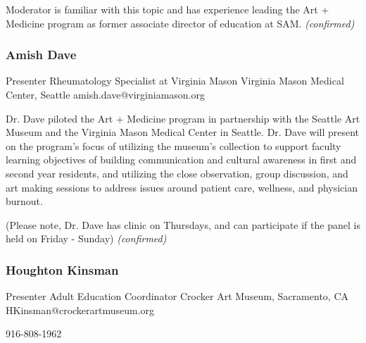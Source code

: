 \documentclass{report}
\begin{document}
                Moderator is familiar with this topic and has experience leading the Art + Medicine program as former associate director of education at SAM.\newline
                \emph{ (confirmed) }
              

              
                \subsubsection*{ Amish Dave }
                Presenter\newline
                Rheumatology Specialist at Virginia Mason\newline
                Virginia Mason Medical Center, Seattle
                \newline
                amish.dave@virginiamason.org\newline
                
                

                Dr. Dave  piloted the Art + Medicine program in partnership with the Seattle Art Museum and the Virginia Mason Medical Center in Seattle. Dr. Dave will present on the program’s focus of utilizing the museum’s collection to support faculty learning objectives of building communication and cultural awareness in first and second year residents, and utilizing the close observation, group discussion, and art making sessions to address issues around patient care, wellness, and physician burnout.

(Please note, Dr. Dave has clinic on Thursdays, and can participate if the panel is held on Friday - Sunday)
                \emph{ (confirmed) }
              

              
                \subsubsection*{ Houghton Kinsman }
                Presenter\newline
                Adult Education Coordinator\newline
                Crocker Art Museum, Sacramento, CA
                \newline
                HKinsman@crockerartmuseum.org\newline
                
                916-808-1962\newline
\end{document}

